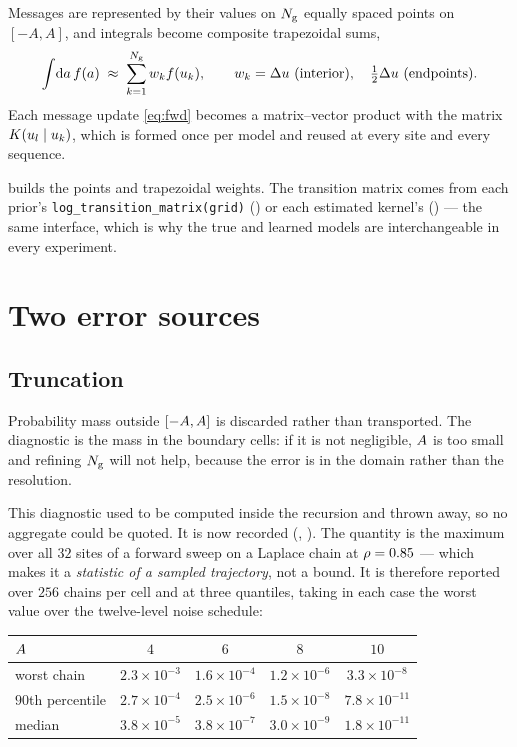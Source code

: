 Messages are represented by their values on $N_{\mathrm{g}}$ equally spaced points on $[-A,A]$, and
integrals become composite trapezoidal sums,
\begin{equation}
\int\!\mathrm{d}a\, f(a) \;\approx\; \sum_{k=1}^{\ngrid} w_k f(u_k),
\qquad
w_k = \Delta u \ \text{(interior)},\quad \tfrac{1}{2}\Delta u \ \text{(endpoints)} .
\end{equation}
Each message update \eqref{eq:fwd} becomes a matrix--vector product with the matrix
$K(u_l\mid u_k)$, which is formed once per model and reused at every site and every
sequence.

\begin{codebox}
 builds the points and trapezoidal weights.
The transition matrix comes from each prior's \texttt{log\_transition\_matrix(grid)}
() or each estimated kernel's () --- the same
interface, which is why the true and learned models are interchangeable in every experiment.
\end{codebox}

\section{Two error sources}

\subsection{Truncation}
\label{sec:truncation}

Probability mass outside $[-A,A]$ is discarded rather than transported. The
diagnostic is the mass in the boundary cells: if it is not negligible, $A$ is too small
and refining $N_{\mathrm{g}}$ will not help, because the error is in the domain rather than the
resolution.

This diagnostic used to be computed inside the recursion and thrown away, so no aggregate could
be quoted. It is now recorded (,
). The quantity is the maximum over all
$32$ sites of a forward sweep on a Laplace chain at $\rho=0.85$ --- which makes it a
\emph{statistic of a sampled trajectory}, not a bound. It is therefore reported over $256$ chains
per cell and at three quantiles, taking in each case the worst value over the twelve-level noise
schedule:

\begin{center}
\small
\begin{tabular}{lcccc}
\toprule
$A$ & $4$ & $6$ & $8$ & $10$ \\
\midrule
worst chain & $2.3\times10^{-3}$ & $1.6\times10^{-4}$ & $1.2\times10^{-6}$
            & $3.3\times10^{-8}$ \\
$90$th percentile & $2.7\times10^{-4}$ & $2.5\times10^{-6}$ & $1.5\times10^{-8}$
                  & $7.8\times10^{-11}$ \\
median & $3.8\times10^{-5}$ & $3.8\times10^{-7}$ & $3.0\times10^{-9}$
       & $1.8\times10^{-11}$ \\
\bottomrule
\end{tabular}
\end{center}

